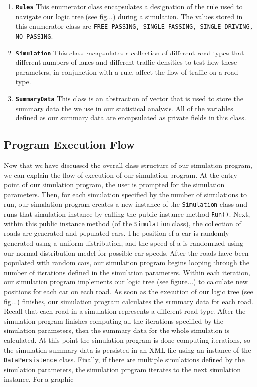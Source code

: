 \documentclass[letterpaper,12pt]{article}
\begin{document}
\begin{enumerate}
{			}
			\item{\textbf{\texttt{Rules}}
				This enumerator class encapsulates a designation of the rule used to navigate our logic tree (see fig...) during a simulation. The values stored in this enumerator class are \texttt{FREE PASSING, SINGLE PASSING, SINGLE DRIVING, NO PASSING}.
			}
			\item{\textbf{\texttt{Simulation}}
				This class encapsulates a collection of different road types that different numbers of lanes and different traffic densities to test how these parameters, in conjunction with a rule, affect the flow of traffic on a road type.
			}
			\item{\textbf{\texttt{SummaryData}}
				This class is an abstraction of vector that is used to store the summary data the we use in our statistical analysis. All of the variables defined as our summary data are encapsulated as private fields in this class.
			}
		\end{enumerate}
		\subsection{Program Execution Flow}		
			Now that we have discussed the overall class structure of our simulation program, we can explain the flow of execution of our simulation program. At the entry point of our simulation program, the user is prompted for the simulation parameters. Then, for each simulation specified by the number of simulations to run, our simulation program creates a new instance of the \texttt{Simulation} class and runs that simulation instance by calling the public instance method \texttt{Run()}. Next, within this public instance method (of the \texttt{Simulation} class), the collection of roads are generated and populated cars. The position of a car is randomly generated using a uniform distribution, and the speed of a is randomized using our normal distribution model for possible car speeds. After the roads have been populated with random cars, our simulation program begins looping through the number of iterations defined in the simulation parameters. Within each iteration, our simulation program implements our logic tree (see figure...) to calculate new positions for each car on each road. As soon as the execution of our logic tree (see fig...) finishes, our simulation program calculates the summary data for each road. Recall that each road in a simulation represents a different road type. After the simulation program finishes computing all the iterations specified by the simulation parameters, then the summary data for the whole simulation is calculated. At this point the simulation program is done computing iterations, so the simulation summary data is persisted in an XML file using an instance of the \texttt{DataPersistence} class. Finally, if there are multiple simulations defined by the simulation parameters, the simulation program iterates to the next simulation instance. For a graphic
\end{document}
